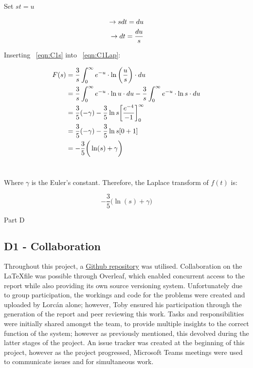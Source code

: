 \documentclass[a4paper,10pt,reqno]{amsart}
\makeatletter
\def\section{\@startsection{section}{1}%
  \z@{.7\linespacing\@plus\linespacing}{.5\linespacing}%
  {\bfseries\scshape\centering}}
\numberwithin{equation}{section}
\makeatother
\begin{document}
\par Set $st = u$

\begin{align}
    \rightarrow sdt = du
    \notag\\
    \rightarrow dt = \frac{du}{s}
    \label{eqn:C1s}
\end{align}

\par Inserting ~\ref{eqn:C1s} into ~\ref{eqn:C1Lap}:

\begin{align}
    F(s) &= \frac{3}{s} \int_0^\infty e^{-u} \cdot \ln{\bigg(\frac{u}{s}\bigg)} \cdot du
    \notag\\
    &= \frac{3}{s} \int_0^\infty e^{-u} \cdot \ln{u} \cdot du - \frac{3}{s} \int_0^\infty e^{-u} \cdot \ln{s} \cdot du
    \notag\\
    &= \frac{3}{5}(-\gamma) - \frac{3}{5}\ln{s}\bigg[\frac{e^{-4}}{-1}\bigg]_0^\infty
    \notag\\
    &= \frac{3}{5}(-\gamma) - \frac{3}{5}\ln{s}[0+1]
    \notag\\
    &= -\frac{3}{5}\bigg(\ln(s) + \gamma\bigg)
    \notag
\end{align}
\\
\par Where $\gamma$ is the Euler's constant. Therefore, the Laplace transform of $f(t)$ is:

\begin{equation}
    -\frac{3}{5}\bigg(\ln(s) + \gamma\bigg)
\end{equation}

\newpage
\section{Part D}

\subsection{D1 - Collaboration}
\par Throughout this project, a \href{https://github.com/Lorcan-Q/Control_Coursework}{Github repository} was utilised. Collaboration on the \LaTeX\;file was possible through Overleaf, which enabled concurrent access to the report while also providing its own source versioning system. Unfortunately due to group participation, the workings and code for the problems were created and uploaded by Lorcán alone; however, Toby ensured his participation through the generation of the report and peer reviewing this work. Tasks and responsibilities were initially shared amongst the team, to provide multiple insights to the correct function of the system; however as previously mentioned, this devolved during the latter stages of the project. An issue tracker was created at the beginning of this project, however as the project progressed, Microsoft Teams meetings were used to communicate issues and for simultaneous work.
\end{document}
